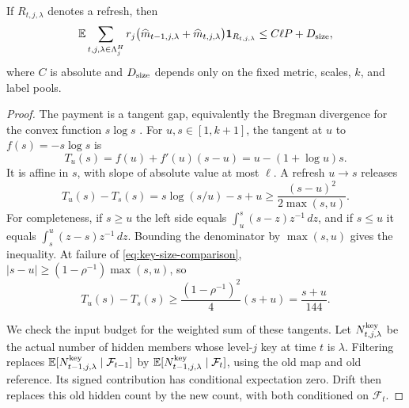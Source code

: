 \begin{lemma}\label{lem:key-size-refresh}
If $R_{t,j,\lambda}$ denotes a refresh, then
\begin{equation}\label{eq:key-size-refresh-budget}
 \mathbb E\sum_{t,j,\lambda\in\Lambda_j^H}
 r_j\bigl(\widehat m_{t-1,j,\lambda}
            +\widehat m_{t,j,\lambda}\bigr)\mathbf 1_{R_{t,j,\lambda}}
 \le C\ell P+D_{\rm size},
\end{equation}
where $C$ is absolute and $D_{\rm size}$ depends only on the fixed
metric, scales, $k$, and label pools.
\end{lemma}

\begin{proof}
The payment is a tangent gap, equivalently the Bregman divergence
for the convex function $s\log s$ \cite{Bregman67}.
For $u,s\in[1,k+1]$, the tangent at $u$ to $f(s)=-s\log s$ is
\begin{equation}\label{eq:entropy-tangent}
 T_u(s)=f(u)+f'(u)(s-u)=u-(1+\log u)s.
\end{equation}
It is affine in $s$, with slope of absolute value at most $\ell$.  A
refresh $u\to s$ releases
\begin{equation}\label{eq:entropy-refresh-credit}
 T_u(s)-T_s(s)=s\log(s/u)-s+u
       \ge\frac{(s-u)^2}{2\max(s,u)}.
\end{equation}
For completeness, if $s\ge u$ the left side equals
$\int_u^s(s-z)z^{-1}\,dz$, and if $s\le u$ it equals
$\int_s^u(z-s)z^{-1}\,dz$.  Bounding the denominator by
$\max(s,u)$ gives the inequality.  At failure of
\eqref{eq:key-size-comparison},
$|s-u|\ge(1-\rho^{-1})\max(s,u)$, so
\begin{equation}\label{eq:entropy-relative-credit}
 T_u(s)-T_s(s)\ge\frac{(1-\rho^{-1})^2}{4}(s+u)
                         =\frac{s+u}{144}.
\end{equation}

We check the input budget for the weighted sum of these tangents.  Let
$N_{t,j,\lambda}^{\rm key}$ be the actual number of hidden members whose
level-$j$ key at time $t$ is $\lambda$.  Filtering replaces
$\mathbb E[N_{t-1,j,\lambda}^{\rm key}\mid\mathcal F_{t-1}]$ by
$\mathbb E[N_{t-1,j,\lambda}^{\rm key}\mid\mathcal F_t]$, using the old map
and old reference.  Its signed contribution has conditional expectation
zero.  Drift then replaces this old hidden count by the new count,
with both conditioned on $\mathcal F_t$.


\end{proof}
